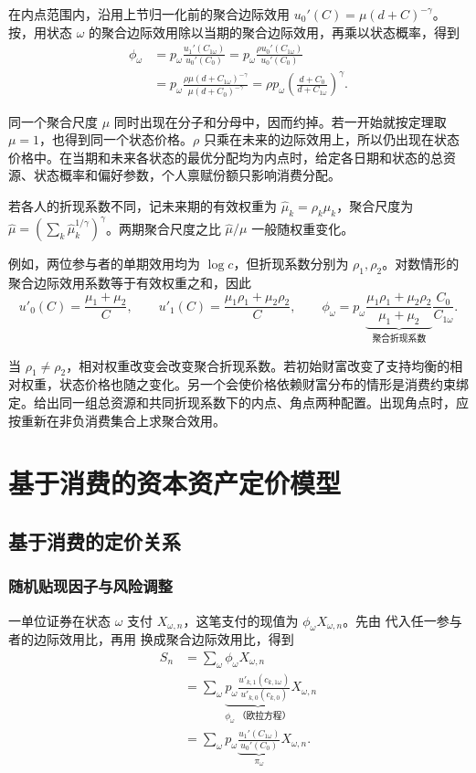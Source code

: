 在内点范围内，沿用上节归一化前的聚合边际效用 $u_0'(C)=\mu(d+C)^{-\gamma}$。按，用状态 $\omega$ 的聚合边际效用除以当期的聚合边际效用，再乘以状态概率，得到
\[
 \begin{aligned}
 \phi_\omega
 &=p_\omega\frac{u_1'(C_{1\omega})}{u_0'(C_0)}
 =p_\omega\frac{\rho u_0'(C_{1\omega})}{u_0'(C_0)}\\
 &=p_\omega\frac{\rho\mu(d+C_{1\omega})^{-\gamma}}
                   {\mu(d+C_0)^{-\gamma}}
 =\rho p_\omega\left(\frac{d+C_0}{d+C_{1\omega}}\right)^\gamma.
 \end{aligned}
\]

同一个聚合尺度 $\mu$ 同时出现在分子和分母中，因而约掉。若一开始就按定理取 $\mu=1$，也得到同一个状态价格。$\rho$ 只乘在未来的边际效用上，所以仍出现在状态价格中。在当期和未来各状态的最优分配均为内点时，给定各日期和状态的总资源、状态概率和偏好参数，个人禀赋份额只影响消费分配。

若各人的折现系数不同，记未来期的有效权重为 $\widehat\mu_k=\rho_k\mu_k$，聚合尺度为 $\widehat\mu=(\sum_k\widehat\mu_k^{1/\gamma})^\gamma$。两期聚合尺度之比 $\widehat\mu/\mu$ 一般随权重变化。

例如，两位参与者的单期效用均为 $\log c$，但折现系数分别为 $\rho_1,\rho_2$。对数情形的聚合边际效用系数等于有效权重之和，因此
\[
 u'_0(C)=\frac{\mu_1+\mu_2}{C},\qquad
 u'_1(C)=\frac{\mu_1\rho_1+\mu_2\rho_2}{C},\qquad
 \phi_\omega
 =p_\omega\underbrace{\frac{\mu_1\rho_1+\mu_2\rho_2}{\mu_1+\mu_2}}_{\text{聚合折现系数}}
     \frac{C_0}{C_{1\omega}}.
\]

当 $\rho_1\ne\rho_2$，相对权重改变会改变聚合折现系数。若初始财富改变了支持均衡的相对权重，状态价格也随之变化。另一个会使价格依赖财富分布的情形是消费约束绑定。给出同一组总资源和共同折现系数下的内点、角点两种配置。出现角点时，应按重新在非负消费集合上求聚合效用。

\section{基于消费的资本资产定价模型}\label{sec:wj-ten-5}
\subsection{基于消费的定价关系}
\subsubsection{随机贴现因子与风险调整}
一单位证券在状态 $\omega$ 支付 $X_{\omega,n}$，这笔支付的现值为 $\phi_\omega X_{\omega,n}$。先由 代入任一参与者的边际效用比，再用 换成聚合边际效用比，得到
\[
 \begin{aligned}
 S_n&=\sum_\omega \phi_\omega X_{\omega,n}\\
 &=\sum_\omega
   \underbrace{p_\omega\frac{u'_{k,1}(c_{k,1\omega})}{u'_{k,0}(c_{k,0})}}_{\phi_\omega\;\text{（欧拉方程）}}
   X_{\omega,n}\\
 &=\sum_\omega p_\omega
   \underbrace{\frac{u_1'(C_{1\omega})}{u_0'(C_0)}}_{\pi_\omega}
   X_{\omega,n}.
 \end{aligned}
\]

